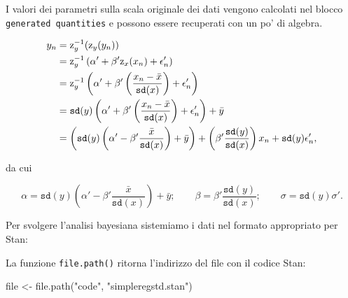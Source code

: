 \documentclass[
  11pt,
]{krantz}
\makeatletter
\newenvironment{Shaded}{\begin{snugshade}}{\end{snugshade}}
\newcommand{\AttributeTok}[1]{\textcolor[rgb]{0.61,0.61,0.61}{#1}}
\newcommand{\FunctionTok}[1]{\textcolor[rgb]{0,0,0}{#1}}
\newcommand{\NormalTok}[1]{#1}
\newcommand{\OtherTok}[1]{\textcolor[rgb]{0.37,0.37,0.37}{#1}}
\newcommand{\SpecialCharTok}[1]{\textcolor[rgb]{0,0,0}{#1}}
\newcommand{\StringTok}[1]{\textcolor[rgb]{0.5,0.5,0.5}{#1}}
\newenvironment{kframe}{%
\medskip{}
\setlength{\fboxsep}{.8em}
 \def\at@end@of@kframe{}%
 \ifinner\ifhmode%
  \def\at@end@of@kframe{\end{minipage}}%
  \begin{minipage}{\columnwidth}%
 \fi\fi%
 \def\FrameCommand##1{\hskip\@totalleftmargin \hskip-\fboxsep
 \colorbox{shadecolor}{##1}\hskip-\fboxsep
     \hskip-\linewidth \hskip-\@totalleftmargin \hskip\columnwidth}%
 \MakeFramed {\advance\hsize-\width
   \@totalleftmargin\z@ \linewidth\hsize
   \@setminipage}}%
 {\par\unskip\endMakeFramed%
 \at@end@of@kframe}
\renewenvironment{Shaded}{\begin{kframe}}{\end{kframe}}
\makeatother
\begin{document}
I valori dei parametri sulla scala originale dei dati vengono calcolati nel blocco \texttt{generated\ quantities} e possono essere recuperati con un po' di algebra.

\begin{align}
y_n &= \textrm{z}_y^{-1}(\textrm{z}_y(y_n)) \notag\\
    &= \textrm{z}_y^{-1}
\left( \alpha' + \beta' \textrm{z}_x(x_n) + \epsilon_n' \right) \notag\\
    &= \textrm{z}_y^{-1}
\left( \alpha' + \beta' \left( \frac{x_n - \bar{x}}{\texttt{sd}(x)} \right) + \epsilon_n' \right) \notag\\
    &= \texttt{sd}(y)
\left( \alpha' + \beta' \left( \frac{x_n - \bar{x}}{\texttt{sd}(x)} \right) + \epsilon_n' \right) + \bar{y} \notag\\
    &=
\left( \texttt{sd}(y) \left( \alpha' - \beta' \frac{\bar{x}}{\texttt{sd}(x)} \right) + \bar{y} \right)
+ \left( \beta' \frac{\texttt{sd}(y)}{\texttt{sd}(x)} \right) x_n
+ \texttt{sd}(y) \epsilon'_n,
\end{align}

da cui

\[
\alpha
=
\texttt{sd}(y)
      \left(
          \alpha'
          - \beta' \frac{\bar{x}}{\texttt{sd}(x)}
      \right)
  + \bar{y};
\qquad
\beta = \beta' \frac{\texttt{sd}(y)}{\texttt{sd}(x)};
\qquad
\sigma = \texttt{sd}(y) \sigma'.
\]

Per svolgere l'analisi bayesiana sistemiamo i dati nel formato appropriato per Stan:

\begin{Shaded}
\end{Shaded}

La funzione \texttt{file.path()} ritorna l'indirizzo del file con il codice Stan:

\begin{Shaded}
\begin{Highlighting}[]
\NormalTok{file }\OtherTok{\textless{}{-}} \FunctionTok{file.path}\NormalTok{(}\StringTok{"code"}\NormalTok{, }\StringTok{"simpleregstd.stan"}\NormalTok{)}
\end{Highlighting}
\end{Shaded}
\end{document}
